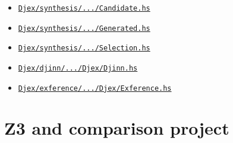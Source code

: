 \documentclass[11pt,letterpaper,openany]{report}
\newcommand{\sourcelink}[2]{\href{#1}{\nolinkurl{#2}}}
\begin{document}
\begin{itemize}
  \item \sourcelink{https://github.com/VladimirReshetnikov/Djex/blob/f50b5eac86726c7530d95e48c27101b7c0fa25c9/synthesis/src/Language/Haskell/Synthesis/Candidate.hs}{Djex/synthesis/.../Candidate.hs}
  \item \sourcelink{https://github.com/VladimirReshetnikov/Djex/blob/f50b5eac86726c7530d95e48c27101b7c0fa25c9/synthesis/src/Language/Haskell/Synthesis/Generated.hs}{Djex/synthesis/.../Generated.hs}
  \item \sourcelink{https://github.com/VladimirReshetnikov/Djex/blob/f50b5eac86726c7530d95e48c27101b7c0fa25c9/synthesis/src/Language/Haskell/Synthesis/Selection.hs}{Djex/synthesis/.../Selection.hs}
  \item \sourcelink{https://github.com/VladimirReshetnikov/Djex/blob/f50b5eac86726c7530d95e48c27101b7c0fa25c9/djinn/src-core/Language/Haskell/Djex/Djinn.hs}{Djex/djinn/.../Djex/Djinn.hs}
  \item \sourcelink{https://github.com/VladimirReshetnikov/Djex/blob/f50b5eac86726c7530d95e48c27101b7c0fa25c9/exference/src-core/Language/Haskell/Djex/Exference.hs}{Djex/exference/.../Djex/Exference.hs}
\end{itemize}

\section*{Z3 and comparison project}
\end{document}
